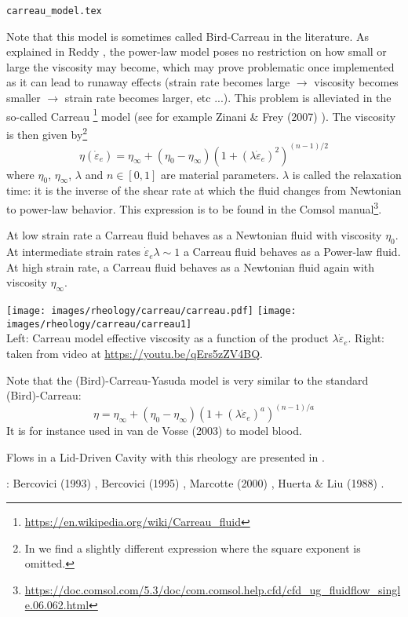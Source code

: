 \begin{flushright} {\tiny {\color{gray} \tt carreau\_model.tex}} \end{flushright}

Note that this model is sometimes called Bird-Carreau in the literature. 
As explained in Reddy \cite{reddybook2}, the power-law model poses no restriction on 
how small or large the viscosity may become, which may prove problematic once 
implemented as it can lead to runaway effects (strain rate becomes large $\rightarrow$
viscosity becomes smaller $\rightarrow$ strain rate becomes larger, etc ...).
This problem is alleviated in the so-called Carreau
\footnote{\url{https://en.wikipedia.org/wiki/Carreau_fluid}} model \cite{carr72} 
(see for example Zinani \& Frey (2007) \cite{zifr07}). 
The viscosity is then given by\footnote{In \cite{saramito}
we find a slightly different expression where the square exponent is
omitted.}
\begin{equation}
\eta(\dot{\varepsilon}_{e}) = \eta_\infty + (\eta_0-\eta_\infty) 
\left(1 + (\lambda \dot{\varepsilon}_{e})^2 \right)^{(n-1)/2}
\end{equation}
where $\eta_0$, $\eta_\infty$, $\lambda$ and $n\in[0,1]$ are material parameters. 
$\lambda$ is called the relaxation time: it is the inverse of the shear rate at which 
the fluid changes from Newtonian to power-law behavior.
This expression is to be found in the Comsol 
manual\footnote{\url{https://doc.comsol.com/5.3/doc/com.comsol.help.cfd/cfd_ug_fluidflow_single.06.062.html}}. 

At low strain rate a Carreau fluid behaves as a Newtonian fluid with 
viscosity $\eta_0$. At intermediate strain rates 
$\dot{\varepsilon}_{e} \lambda \sim 1$ a Carreau fluid behaves 
as a Power-law fluid. At high strain rate, a Carreau fluid behaves 
as a Newtonian fluid again with viscosity $\eta_\infty$.
 
\begin{center}
\texttt{[image: images/rheology/carreau/carreau.pdf]}
\texttt{[image: images/rheology/carreau/carreau1]}\\
{\captionfont Left: Carreau model effective viscosity as a function of 
the product $\lambda \dot{\varepsilon}_{e}$. Right: taken from 
video at \url{https://youtu.be/qErs5zZV4BQ}.}
\end{center}

Note that the (Bird)-Carreau-Yasuda model \cite{yaac81,osru14} is 
very similar to the standard (Bird)-Carreau:
\begin{equation}
\eta = \eta_\infty + (\eta_0-\eta_\infty) 
\left(1 + (\lambda \dot{\varepsilon}_{e})^a \right)^{(n-1)/a}
\end{equation}
It is for instance used in van de Vosse \etal (2003) \cite{vadv03} to model blood.

Flows in a Lid-Driven Cavity with this rheology are presented in \cite{zifr07,shal09}.

\Literature: Bercovici (1993) \cite{berc93}, Bercovici (1995) \cite{berc95},
Marcotte (2000) \cite{marc00}, Huerta \& Liu (1988) \cite{huli88}.
